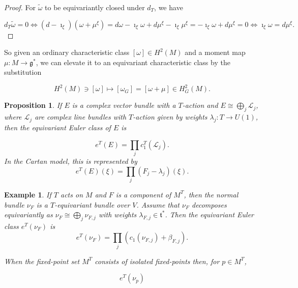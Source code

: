 \documentclass{article}
\newtheorem{prop}[theorem]{Proposition}
\newtheorem{example}{Example}
\newcommand{\ra}{\rightarrow}
\newcommand{\w}{\omega}
\newcommand{\mcL}{\mathcal{L}}
\newcommand{\mfg}{\mathfrak{g}}
\newcommand{\mft}{\mathfrak{t}}
\begin{document}
\begin{proof}
	For $\tilde{\w}$ to be equivariantly closed under $d_{T}$, we have
	
	\begin{equation*}
		d_{T}\tilde{\w} = 0 \iff (d - \imath_{\xi})(\w + \mu^{\xi}) = d\w - \imath_{\xi}\w + d\mu^{\xi} - \imath_{\xi}\mu^{\xi} = -\imath_{\xi}\w + d\mu^{\xi} = 0 \iff \imath_{\xi}\w = d\mu^{\xi}.
	\end{equation*}
\end{proof}

So given an ordinary characteristic class $[\w] \in H^{2}(M)$ and a moment map $\mu : M \ra \mfg^{\ast}$, we can elevate it to an equivariant characteristic class by the substitution

\begin{equation*}
		H^{2}(M) \ni [\w] \longmapsto [\w_{G}] = [\w + \mu] \in H_{G}^{2}(M).
\end{equation*}

\begin{prop}
	If $E$ is a complex vector bundle with a $T$-action and $E \cong \bigoplus_{j} \mcL_{j}$, where $\mcL_{j}$ are complex line bundles with $T$-action given by weights $\lambda_{j} : T \ra U(1)$, then the equivariant Euler class of $E$ is
	
	\begin{equation*}
		e^{T}(E) = \prod\limits_{j} c_{1}^{T}(\mcL_{j}).
	\end{equation*}
	In the Cartan model, this is represented by
	\begin{equation*}
		e^{T}(E)(\xi) = \prod\limits_{j} (F_{j} - \lambda_{j})(\xi).
	\end{equation*}
\end{prop}

\begin{example}
	If $T$ acts on $M$ and $F$ is a component of $M^{T}$, then the normal bundle $\nu_{F}$ is a $T$-equivariant bundle over $V$. Assume that $\nu_{F}$ decomposes equivariantly as $\nu_{F} \cong \bigoplus_{j} \nu_{F, j}$ with weights $\lambda_{F, j} \in \mft^{\ast}$. Then the equivariant Euler class $e^{T}(\nu_{F})$ is
	\begin{equation*}
		e^{T}(\nu_{F}) = \prod\limits_{j} \left( c_{1}(\nu_{F,j}) + \beta_{F,j} \right).
	\end{equation*}

	When the fixed-point set $M^{T}$ consists of isolated fixed-points then, for $p \in M^{T}$,
	
	\begin{equation*}
		e^{T}(\nu_{p})
	\end{equation*}

\end{example}
\end{document}
